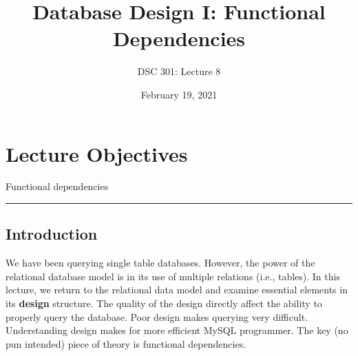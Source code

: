 \documentclass{article}
\newtheorem{definition}{Definition}
\begin{document}
\title{Database Design I: Functional Dependencies}
\author{DSC 301: Lecture 8}
\date{February 19, 2021} %
\maketitle





\begin{outline}[enumerate]

\end{outline}
\begin{outline}
        
\end{outline}




\section*{Lecture Objectives}
\begin{outline}
        \1  Functional dependencies
       
       
        

\end{outline}

\hspace{-0.5cm}\rule[0.101in]{\textwidth}{0.0025in}
% 
% 

\subsection*{Introduction}

\noindent We have been querying single table databases.  However, the power of the relational database model is in its use of multiple relations (i.e., tables).  In this lecture, we return to the relational data model and examine essential elements in its \textbf{design} structure. The quality of the design directly affect the ability to properly query the database.  Poor design makes querying very difficult.  Understanding design makes for more efficient  MySQL programmer.  The key (no pun intended) piece of theory is functional dependencies.\\  %
\end{document}
